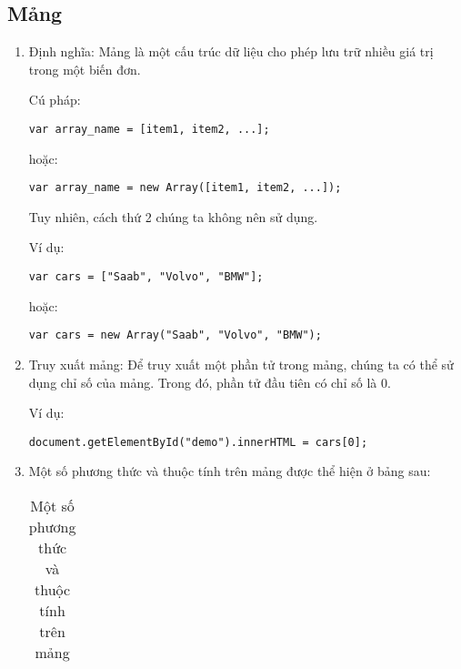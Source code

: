 \subsection{Mảng}
\begin{enumerate}
\item	Định nghĩa: Mảng là một cấu trúc dữ liệu cho phép lưu trữ nhiều giá trị trong một biến đơn.

Cú pháp:
\lstset{language=XML}
\begin{lstlisting}[escapechar=`]
	var array_name = [item1, item2, ...];
\end{lstlisting}

hoặc:
\lstset{language=XML}
\begin{lstlisting}[escapechar=`]
	var array_name = new Array([item1, item2, ...]);
\end{lstlisting}
Tuy nhiên, cách thứ 2 chúng ta không nên sử dụng.

Ví dụ:
\lstset{language=XML}
\begin{lstlisting}[escapechar=`]
	var cars = ["Saab", "Volvo", "BMW"];
\end{lstlisting}

hoặc:
\lstset{language=XML}
\begin{lstlisting}[escapechar=`]
	var cars = new Array("Saab", "Volvo", "BMW");
\end{lstlisting}
\item	Truy xuất mảng: Để truy xuất một phần tử trong mảng, chúng ta có thể sử dụng chỉ số của mảng. Trong đó, phần tử đầu tiên có chỉ số là 0. 

Ví dụ:

\lstset{language=XML}
\begin{lstlisting}[escapechar=`]
	document.getElementById("demo").innerHTML = cars[0];
\end{lstlisting}
\item	Một số phương thức và thuộc tính trên mảng được thể hiện ở bảng sau:

\begin{center}
 \begin{longtable}{|m{3cm}|m{7cm}|}
 \caption[Một số phương thức và thuộc tính trên mảng]{Một số phương thức và thuộc tính trên mảng}
  \endfirsthead
  \endhead
 

\end{longtable}
\end{center}
\end{enumerate}
